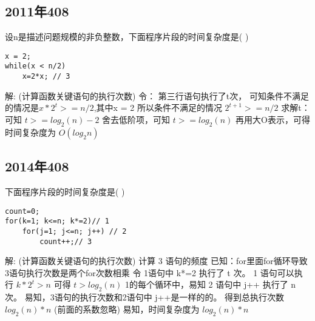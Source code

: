 \subsection{2011年408}
设n是描述问题规模的非负整数，下面程序片段的时间复杂度是( )
\begin{lstlisting}[basicstyle=\small\ttfamily, caption={}, numbers=none]
x = 2;
while(x < n/2)
	x=2*x; // 3
\end{lstlisting}
解:\newline
{\color{red}(计算函数关键语句的执行次数)}\newline
令： 第三行语句执行了t次，\newline
可知条件不满足的情况是$ x*2^t >= n/2 $,其中x = 2\newline
所以条件不满足的情况 $ 2^{t+1} >= n/2  $ \newline
求解t： 可知 $t >= log_2(n) - 2$ \newline
舍去低阶项，可知 $ t >= log_2(n)$ \newline
再用大O表示，可得时间复杂度为 $O(log_2 n)$

\subsection{2014年408}
下面程序片段的时间复杂度是( )
\begin{lstlisting}[basicstyle=\small\ttfamily, caption={}, numbers=none]
count=0;
for(k=1; k<=n; k*=2)// 1
	for(j=1; j<=n; j++) // 2
		count++;// 3
\end{lstlisting}
解:\newline
{\color{red}(计算函数关键语句的执行次数)}\newline
计算 3 语句的频度\newline
已知：for里面for循环导致3语句执行次数是两个for次数相乘\newline
令 1语句中 k*=2 执行了 t 次。
1 语句可以执行 $ k*2^t > n $ \newline
可得 $ t > log_2 (n) $ \newline
1的每个循环中，易知 2 语句中 j++ 执行了 n 次。\newline
易知，3语句的执行次数和2语句中 j++是一样的的。\newline
得到总执行次数$ log_2 (n) * n$ (前面的系数忽略)\newline
易知，时间复杂度为 $ log_2 (n) * n $\newline

